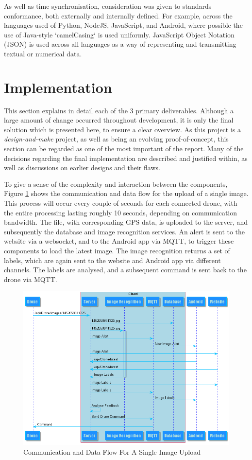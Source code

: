 \documentclass{article}
\begin{document}
As well as time synchronisation, consideration was given to standards conformance, both externally and internally defined. For example, across the languages used of Python, NodeJS, JavaScript, and Android, where possible the use of Java-style `camelCasing` is used uniformly. JavaScript Object Notation (JSON) is used across all languages as a way of representing and transmitting textual or numerical data.

\section{Implementation}
This section explains in detail each of the 3 primary deliverables. Although a large amount of change occurred throughout development, it is only the final solution which is presented here, to ensure a clear overview. As this project is a \textit{design-and-make} project, as well as being an evolving proof-of-concept, this section can be regarded as one of the most important of the report. Many of the decisions regarding the final implementation are described and justified within, as well as discussions on earlier designs and their flaws. 

To give a sense of the complexity and interaction between the components, Figure \ref{fig:CommSingleUpload} shows the communication and data flow for the upload of a single image. This process will occur every couple of seconds for each connected drone, with the entire processing lasting roughly 10 seconds, depending on communication bandwidth. The file, with corresponding GPS data, is uploaded to the server, and subsequently the database and image recognition services. An alert is sent to the website via a websocket, and to the Android app via MQTT, to trigger these components to load the latest image. The image recognition returns a set of labels, which are again sent to the website and Android app via different channels. The labels are analysed, and a subsequent command is sent back to the drone via MQTT.

\begin{figure}[h]
\centering
\caption{Communication and Data Flow For A Single Image Upload\label{fig:CommSingleUpload}}
\includegraphics[width=\textwidth]{CommSingleUpload}
\end{figure}
 
\end{document}

